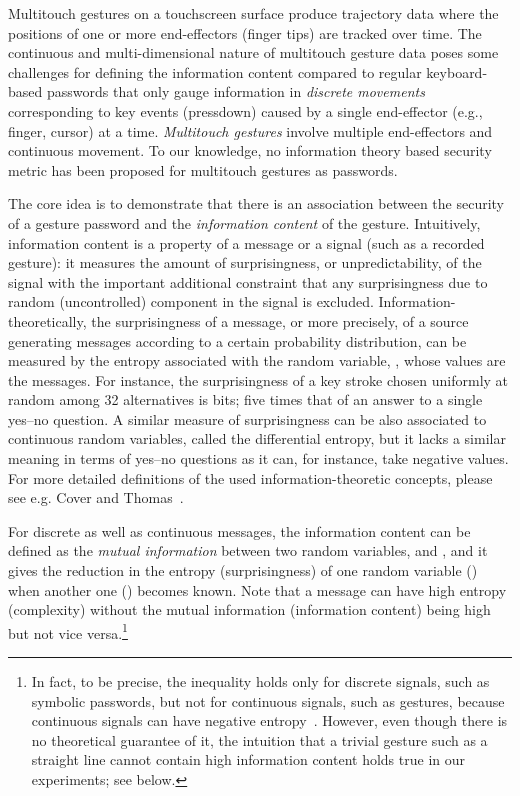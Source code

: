\documentclass{sig-alternate-10pt}
\begin{document}
Multitouch gestures on a touchscreen surface produce trajectory data where the positions of one or more end-effectors (finger tips) are tracked over time.
The continuous and multi-dimensional nature of multitouch gesture data poses some challenges for defining the information content
compared to regular keyboard-based passwords that only gauge information in \emph{discrete movements} corresponding to key events (pressdown) caused by a single end-effector (e.g., finger, cursor) at a time.
\emph{Multitouch gestures} involve multiple end-effectors and continuous movement.
To our knowledge, no information theory based security metric has been proposed for multitouch gestures as passwords.



The core idea is to demonstrate that there is an association between the security of a gesture password and the \emph{information content} of the gesture. Intuitively, information content is a property of a
message or a signal (such as a recorded gesture): it measures
the amount of surprisingness, or unpredictability, of the signal
with the important additional constraint that any surprisingness
due to random (uncontrolled) component in the signal is
excluded. Information-theoretically, the surprisingness of a message, or more precisely, of a source generating messages according to a certain probability distribution, can be measured by the entropy  associated with the random variable, , whose values are the messages. For instance, the surprisingness of a key stroke chosen uniformly at random among 32 alternatives is  
bits; five times that of an answer to a single yes--no question.
A similar measure of surprisingness can be also associated to continuous random variables, called the differential entropy, but it lacks a similar meaning in terms of yes--no questions as it can, for instance, take negative values. For more detailed definitions of the used information-theoretic concepts, please see e.g. Cover and Thomas~\cite{cover-thomas}. 

For discrete as well as continuous messages, the information content can be defined as the \emph{mutual information}  between two random variables,  and , and it gives the reduction in the entropy (surprisingness) of one random variable () when another one () becomes known. Note that a message can have high entropy (complexity) without the mutual information (information content) being high but not vice versa.\footnote{In fact, to be precise, the inequality  holds only for discrete signals, such as symbolic passwords, but not for continuous signals, such as gestures, because continuous signals can have negative entropy~\cite{cover-thomas}. However, even though there is no theoretical guarantee of it, the intuition that a trivial gesture such as a straight line cannot contain high information content holds true in our experiments; see below.} 
\end{document}

